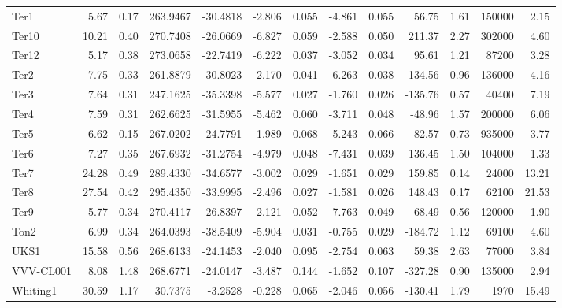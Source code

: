 \begin{longtable}{ | l | r | r| r | r | r | r | r | r | r | r | r | r  |}
            Ter1          &   5.67 & 0.17 & 263.9467 & -30.4818 &  -2.806 & 0.055 &  -4.861 &  0.055 &   56.75 &  1.61 &  150000 &  2.15\\ 
            Ter10         &  10.21 & 0.40 & 270.7408 & -26.0669 &  -6.827 & 0.059 &  -2.588 &  0.050 &  211.37 &  2.27 &  302000 &  4.60\\ 
            Ter12         &   5.17 & 0.38 & 273.0658 & -22.7419 &  -6.222 & 0.037 &  -3.052 &  0.034 &   95.61 &  1.21 &   87200 &  3.28\\ 
            Ter2          &   7.75 & 0.33 & 261.8879 & -30.8023 &  -2.170 & 0.041 &  -6.263 &  0.038 &  134.56 &  0.96 &  136000 &  4.16\\ 
            Ter3          &   7.64 & 0.31 & 247.1625 & -35.3398 &  -5.577 & 0.027 &  -1.760 &  0.026 & -135.76 &  0.57 &   40400 &  7.19\\ 
            Ter4          &   7.59 & 0.31 & 262.6625 & -31.5955 &  -5.462 & 0.060 &  -3.711 &  0.048 &  -48.96 &  1.57 &  200000 &  6.06\\ 
            Ter5          &   6.62 & 0.15 & 267.0202 & -24.7791 &  -1.989 & 0.068 &  -5.243 &  0.066 &  -82.57 &  0.73 &  935000 &  3.77\\ 
            Ter6          &   7.27 & 0.35 & 267.6932 & -31.2754 &  -4.979 & 0.048 &  -7.431 &  0.039 &  136.45 &  1.50 &  104000 &  1.33\\ 
            Ter7          &  24.28 & 0.49 & 289.4330 & -34.6577 &  -3.002 & 0.029 &  -1.651 &  0.029 &  159.85 &  0.14 &   24000 & 13.21\\ 
            Ter8          &  27.54 & 0.42 & 295.4350 & -33.9995 &  -2.496 & 0.027 &  -1.581 &  0.026 &  148.43 &  0.17 &   62100 & 21.53\\ 
            Ter9          &   5.77 & 0.34 & 270.4117 & -26.8397 &  -2.121 & 0.052 &  -7.763 &  0.049 &   68.49 &  0.56 &  120000 &  1.90\\ 
            Ton2          &   6.99 & 0.34 & 264.0393 & -38.5409 &  -5.904 & 0.031 &  -0.755 &  0.029 & -184.72 &  1.12 &   69100 &  4.60\\ 
            UKS1          &  15.58 & 0.56 & 268.6133 & -24.1453 &  -2.040 & 0.095 &  -2.754 &  0.063 &   59.38 &  2.63 &   77000 &  3.84\\ 
            VVV-CL001     &   8.08 & 1.48 & 268.6771 & -24.0147 &  -3.487 & 0.144 &  -1.652 &  0.107 & -327.28 &  0.90 &  135000 &  2.94\\ 
            Whiting1      &  30.59 & 1.17 &  30.7375 &  -3.2528 &  -0.228 & 0.065 &  -2.046 &  0.056 & -130.41 &  1.79 &    1970 & 15.49\\ 
            \end{longtable}


